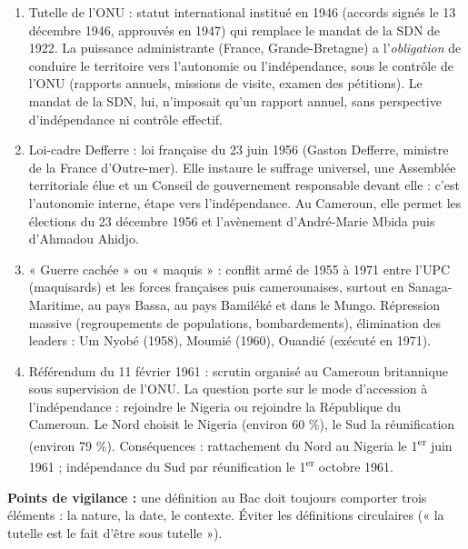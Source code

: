 \documentclass[11pt]{article}
\newcommand{\cle}[1]{{\popxbold\color{popdark}#1}}
\begin{document}
\begin{corrige}
\begin{enumerate}
\item \cle{Tutelle de l'ONU} : statut international institué en 1946 (accords signés le 13 décembre 1946, approuvés en 1947) qui remplace le mandat de la SDN de 1922. La puissance administrante (France, Grande-Bretagne) a l'\emph{obligation} de conduire le territoire vers l'autonomie ou l'indépendance, sous le contrôle de l'ONU (rapports annuels, missions de visite, examen des pétitions). Le mandat de la SDN, lui, n'imposait qu'un rapport annuel, sans perspective d'indépendance ni contrôle effectif.
\item \cle{Loi-cadre Defferre} : loi française du 23 juin 1956 (Gaston Defferre, ministre de la France d'Outre-mer). Elle instaure le suffrage universel, une Assemblée territoriale élue et un Conseil de gouvernement responsable devant elle : c'est l'autonomie interne, étape vers l'indépendance. Au Cameroun, elle permet les élections du 23 décembre 1956 et l'avènement d'André-Marie Mbida puis d'Ahmadou Ahidjo.
\item \cle{« Guerre cachée » ou « maquis »} : conflit armé de 1955 à 1971 entre l'UPC (maquisards) et les forces françaises puis camerounaises, surtout en Sanaga-Maritime, au pays Bassa, au pays Bamiléké et dans le Mungo. Répression massive (regroupements de populations, bombardements), élimination des leaders : Um Nyobé (1958), Moumié (1960), Ouandié (exécuté en 1971).
\item \cle{Référendum du 11 février 1961} : scrutin organisé au Cameroun britannique sous supervision de l'ONU. La question porte sur le mode d'accession à l'indépendance : rejoindre le Nigeria ou rejoindre la République du Cameroun. Le Nord choisit le Nigeria (environ 60 \%), le Sud la réunification (environ 79 \%). Conséquences : rattachement du Nord au Nigeria le 1\textsuperscript{er} juin 1961 ; indépendance du Sud par réunification le 1\textsuperscript{er} octobre 1961.
\end{enumerate}
\textbf{Points de vigilance :} une définition au Bac doit toujours comporter trois éléments : la nature, la date, le contexte. Éviter les définitions circulaires (« la tutelle est le fait d'être sous tutelle »).
\end{corrige}
\end{document}
